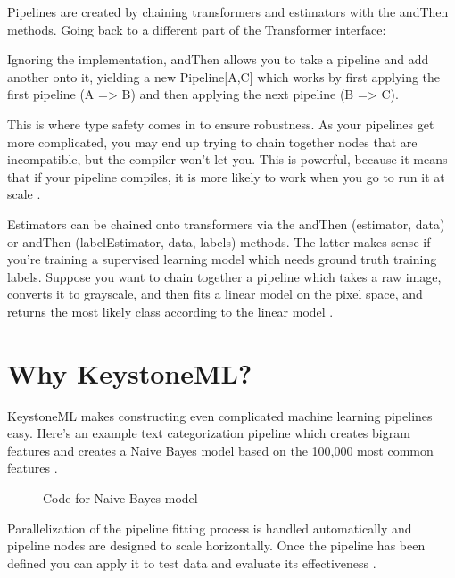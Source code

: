 \documentclass[9pt,twocolumn,twoside]{../../styles/osajnl}
\begin{document}
Pipelines are created by chaining transformers and estimators with the
andThen methods. Going back to a different part of the Transformer
interface:

Ignoring the implementation, andThen allows you to take a pipeline and
add another onto it, yielding a new Pipeline[A,C] which works by first
applying the first pipeline (A => B) and then applying the next
pipeline (B => C).

This is where type safety comes in to ensure robustness. As your
pipelines get more complicated, you may end up trying to chain
together nodes that are incompatible, but the compiler won’t let
you. This is powerful, because it means that if your pipeline
compiles, it is more likely to work when you go to run it at scale \cite{www-keystoneml} .

Estimators can be chained onto transformers via the andThen
(estimator, data) or andThen (labelEstimator, data, labels)
methods. The latter makes sense if you’re training a supervised
learning model which needs ground truth training labels. Suppose you
want to chain together a pipeline which takes a raw image, converts it
to grayscale, and then fits a linear model on the pixel space, and
returns the most likely class according to the linear model \cite{www-keystoneml} .

\section{Why KeystoneML?}

KeystoneML makes constructing even complicated machine learning
pipelines easy. Here’s an example text categorization pipeline which
creates bigram features and creates a Naive Bayes model based on the
100,000 most common features \cite{www-keystoneml1} .

\begin{figure}[htbp]
\centering
{}
\caption{Code for Naive Bayes model}
\label{fig:Code for Naive Bayes model}
\end{figure}


Parallelization of the pipeline fitting
process is handled automatically and pipeline nodes are designed to
scale horizontally. Once the pipeline has been defined you can apply
it to test data and evaluate its effectiveness \cite{www-keystoneml} .
\end{document}
